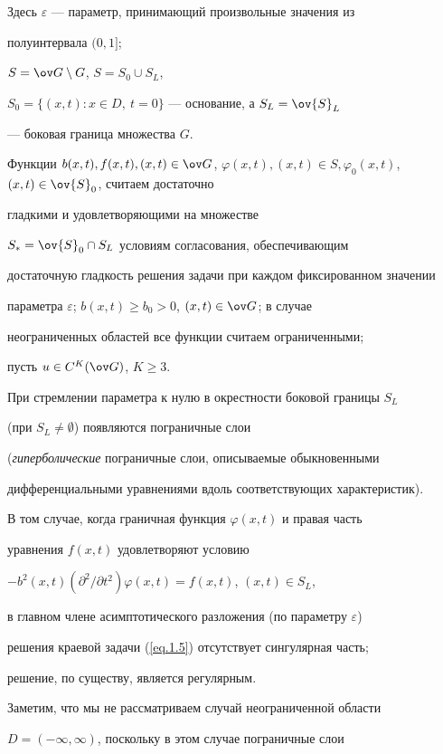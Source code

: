 Здесь $\varepsilon$ --- параметр, принимающий произвольные значения из


полуинтервала $(0,1]$; 


$S=\ov G\setminus G$, $S=S_0\cup S_L$,


$S_0=\{(x,t): x\in D,\ t=0\}$ --- основание, а $S_L=\ov{S}_L$


--- боковая граница множества $G$.


Функции $b(x, t), f(x, t), (x, t)\in \ov G$, $\varphi(x, t), (x,


t)\in S, \varphi_0(x, t)$, $(x, t)\in \ov{S}_0$, считаем достаточно


гладкими и удовлетворяющими на множестве


$S_*=\ov{S}_0\cap S_L$ условиям согласования, обеспечивающим


достаточную гладкость решения задачи при каждом фиксированном значении


параметра $\varepsilon$; $b(x, t)\ge b_0> 0$, $(x, t)\in \ov G$; в случае


неограниченных областей все функции считаем ограниченными;


пусть $u\in C^K(\ov G)$, $K\ge 3$.





При стремлении параметра к нулю в окрестности боковой границы $S_L$


(при $S_L\ne\emptyset$) появляются пограничные слои


({\em гиперболические} пограничные слои, описываемые обыкновенными


дифференциальными уравнениями вдоль соответствующих характеристик).


В том случае, когда граничная функция $\varphi(x, t)$ и правая часть


уравнения $f(x, t)$ удовлетворяют условию


$-b^2(x,t)(\partial^2/\partial t^2)\varphi(x,t)=f(x,t)$, $(x,t)\in S_L$,


в главном члене асимптотического разложения (по параметру $\varepsilon$)


решения краевой задачи (\ref{eq.1.5}) отсутствует сингулярная часть;


решение, по существу, является регулярным.





Заметим, что мы не рассматриваем случай неограниченной области


$D=(-\infty, \infty)$, поскольку в этом случае пограничные слои



